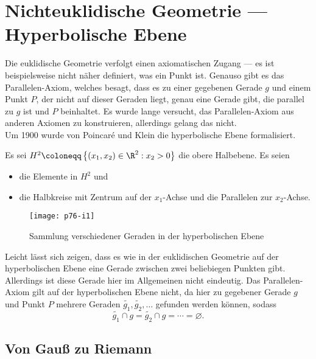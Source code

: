 \chapter{Nichteuklidische Geometrie --- Hyperbolische Ebene}

Die euklidische Geometrie verfolgt einen axiomatischen Zugang --- es ist beispielsweise nicht näher definiert, was ein Punkt ist. Genauso gibt es das Parallelen-Axiom, welches besagt, dass es zu einer gegebenen Gerade \( g \) und einem Punkt \( P \), der nicht auf dieser Geraden liegt, genau eine Gerade gibt, die parallel zu \( g \) ist und \( P \) beinhaltet. Es wurde lange versucht, das Parallelen-Axiom aus anderen Axiomen zu konstruieren, allerdings gelang das nicht. \\
Um 1900 wurde von Poincaré und Klein die hyperbolische Ebene formalisiert.

\begin{definition}
  Es sei \( H^2 \coloneqq \left \{ \left( x_1, x_2 \right) \in \R^2 : x_2 > 0 \right \} \) die obere Halbebene. Es seien
  \begin{itemize}
    \item {} die Elemente in \( H^2 \) und
    \item {} die Halbkreise mit Zentrum auf der \( x_1 \)-Achse und die Parallelen zur \( x_2 \)-Achse.
  \end{itemize}

  \begin{figure}[H]
    \texttt{[image: p76-i1]}
    \caption{Sammlung verschiedener Geraden in der hyperbolischen Ebene}
  \end{figure}

  Leicht lässt sich zeigen, dass es wie in der euklidischen Geometrie auf der hyperbolischen Ebene eine Gerade zwischen zwei beliebiegen Punkten gibt. Allerdings ist diese Gerade hier im Allgemeinen nicht eindeutig. Das Parallelen-Axiom gilt auf der hyperbolischen Ebene nicht, da hier zu gegebener Gerade \( g \) und Punkt \( P \) mehrere Geraden \( \widetilde{g_1}, \widetilde{g_2}, \dots \) gefunden werden können, sodass
  \begin{equation*}
    \widetilde{g_1} \cap g = \widetilde{g_2} \cap g = \cdots = \varnothing\text{.}
  \end{equation*}
\end{definition}

\section{Von Gauß zu Riemann}


